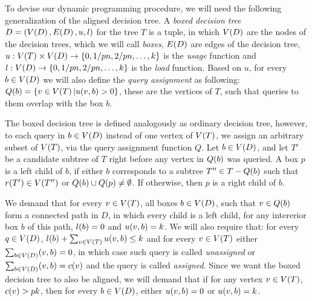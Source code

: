 

To devise our dynamic programming procedure, we will need the following generalization of the aligned decision tree. A \textit{boxed decision tree} $D=\mathopen{}\left( V\mathopen{}\left( D \right), E\mathopen{}\left( D \right), u, l \right)$ for the tree $T$ is a tuple, in which $V\mathopen{}\left( D \right)$ are the nodes of the decision trees, which we will call \textit{boxes}, $E\mathopen{}\left( D \right)$ are edges of the decision tree, $u:V\mathopen{}\left( T \right)\times V\mathopen{}\left( D \right)\to \mathopen{}\left\{ 0, 1/pn,2/pn,\dots,k \right\}$ is the \textit{usage} function and $l:V\mathopen{}\left( D \right)\to\mathopen{}\left\{ 0, 1/pn,2/pn,\dots,k \right\}$ is the \textit{load} function. Based on $u$, for every $b\in V\mathopen{}\left( D \right)$ we will also define the \textit{query assignment} as following: $Q\mathopen{}\left( b \right)=\mathopen{}\left\{ v\in V\mathopen{}\left( T \right)|u\mathopen{}\left( v,b \right)>0 \right\}$, these are the vertices of $T$, such that queries to them overlap with the box $b$.

The boxed decision tree is defined analogously as ordinary decision tree, however, to each query in $b\in V\mathopen{}\left( D \right)$ instead of one vertex of $V\mathopen{}\left( T \right)$, we assign an arbitrary subset of $V\mathopen{}\left( T \right)$, via the query assignment function $Q$. Let $b\in V\mathopen{}\left( D \right)$, and let $T'$ be a candidate subtree of $T$ right before any vertex in $Q\mathopen{}\left( b \right)$ was queried. A box $p$ is a left child of $b$, if either $b$ corresponds to a subtree $T''\in T-Q\mathopen{}\left( b \right)$ such that $r\mathopen{}\left( T' \right)\in V\mathopen{}\left( T'' \right)$ or $Q\mathopen{}\left( b \right)\cup Q\mathopen{}\left( p \right)\neq \emptyset$. If otherwise, then $p$ is a right child of $b$.

We demand that for every $v\in V\mathopen{}\left( T \right)$, all boxes $b\in V\mathopen{}\left( D \right)$, such that $v\in Q\mathopen{}\left( b \right)$ form a connected path in $D$, in which every child is a left child, for any intererior box $b$ of this path, $l\mathopen{}\left( b \right)=0$ and $u\mathopen{}\left( v,b \right)=k$. We will also require that: for every $q\in V\mathopen{}\left( D \right)$, $l\mathopen{}\left( b \right)+\sum_{v\in V\mathopen{}\left( T \right)}u\mathopen{}\left( v,b \right)\leq k$ and for every $v\in V\mathopen{}\left( T \right)$ either $\sum_{b\in V\mathopen{}\left( D \right)}\mathopen{}\left( v,b \right)=0$, in which case such query is called \textit{unassigned} or $\sum_{b\in V\mathopen{}\left( D \right)}\mathopen{}\left( v,b \right)=c\mathopen{}\left( v \right)$ and the query is called \textit{assigned}. Since we want the boxed decision tree to also be aligned, we will demand that if for any vertex $v\in V\mathopen{}\left( T \right)$, $c\mathopen{}\left( v \right)>pk$, then for every $b\in V\mathopen{}\left( D \right)$, either $u\mathopen{}\left( v,b \right)=0$ or $u\mathopen{}\left( v,b \right)=k$. 

